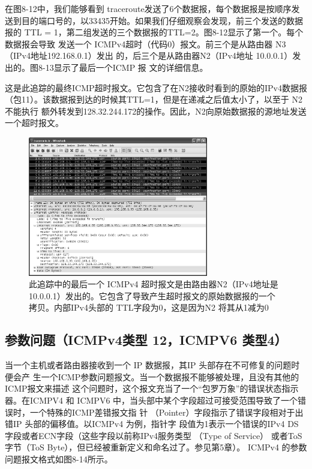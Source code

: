 在图8-12中，我们能够看到 traceroute发送了6个数据报，每个数据报是按顺序发
送到目的端口号的，以33435开始。如果我们仔细观察会发现，前三个发送的数据报的
TTL = 1，第二组发送的三个数据报的TTL=2。图8-12显示了第一个。每个数据报会导致
发送一个 ICMPv4超时（代码0）报文。前三个是从路由器 N3（IPv4地址192.168.0.1）发出
的，后三个是从路由器N2（IPv4地址 10.0.0.1）发出的。图8-13显示了最后一个ICMP 报
文的详细信息。

这是此追踪的最终ICMP超时报文。它包含了在N2接收时看到的原始的IPv4数据报
（包11）。该数据报到达的时候其TTL=1，但是在递减之后值太小了，以至于 N2 不能执行
额外转发到128.32.244.172的操作。因此，N2向原始数据报的源地址发送一个超时报文。
\begin{figure}[!htb]
  \centering
  \includegraphics[width=0.7\textwidth]{imgs/8/8-13.png}
  \caption{此追踪中的最后一个 ICMPv4
    超时报文是由路由器N2（IPv4地址是10.0.0.1）发出的。它包含了导致产生超时报文的原始数据报的一个拷贝。内部IPv4头部的
  TTL字段为0，这是因为N2 将其从1减为0}
\end{figure}

\subsection{参数问题（ICMPv4类型 12，ICMPV6 类型4）}

当一个主机或者路由器接收到一个 IP 数据报，其IP 头部存在不可修复的问题时便会产
生一个ICMP参数问题报文。当一个数据报不能够被处理，且没有其他的ICMP报文来描述
这个问题时，这个报文充当了一个“包罗万象”的错误状态指示器。在ICMPV4 和 ICMPV6
中，当头部中某个字段超过可接受范围导致了一个错误时，一个特殊的ICMP差错报文指
针 （Pointer）字段指示了错误字段相对于出错IP 头部的偏移值。以ICMPv4 为例，指针字
段值为1表示一个错误的IPv4 DS 字段或者ECN字段（这些字段以前称IPv4服务类型
（Type of Service） 或者ToS 字节（ToS Byte），但已经被重新定义和命名过了。参见第5章）。
ICMPv4 的参数问题报文格式如图8-14所示。

